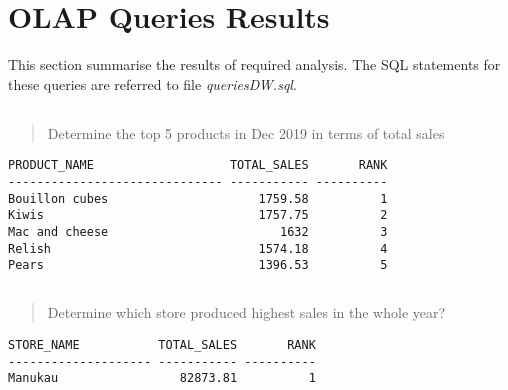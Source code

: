 \documentclass[
  a4paper,
]{article}
\newcommand{\sqloutputbegin}{
        \hspace{0.5cm}
        \begin{minipage}[c]{0.93\linewidth} 
        \centering
        \begin{tcolorbox}[colback=gray!8, colframe=white,
            boxrule=0pt, coltitle=black,
            colbacktitle=gray!15, title={SQL Output}]
        \centering
        \small}
\newcommand{\sqloutputend}{
        \end{tcolorbox} 
        \end{minipage}}
\begin{document}
\hypertarget{olap-queries-results}{%
\section{OLAP Queries Results}\label{olap-queries-results}}

This section summarise the results of required analysis. The SQL
statements for these queries are referred to file \emph{queriesDW.sql}.

\let\oldsubsection\thesubsection
\renewcommand*{\thesubsection}{Question~\arabic{subsection}}

\hypertarget{section}{%
\subsection{}\label{section}}

\begin{quote}
Determine the top 5 products in Dec 2019 in terms of total sales
\end{quote}

\sqloutputbegin

\begin{verbatim}
PRODUCT_NAME                   TOTAL_SALES       RANK
------------------------------ ----------- ----------
Bouillon cubes                     1759.58          1
Kiwis                              1757.75          2
Mac and cheese                        1632          3
Relish                             1574.18          4
Pears                              1396.53          5
\end{verbatim}

\sqloutputend

\hypertarget{section-1}{%
\subsection{}\label{section-1}}

\begin{quote}
Determine which store produced highest sales in the whole year?
\end{quote}

\sqloutputbegin

\begin{verbatim}
STORE_NAME           TOTAL_SALES       RANK
-------------------- ----------- ----------
Manukau                 82873.81          1
\end{verbatim}

\sqloutputend

\hypertarget{section-2}{%
\subsection{}\label{section-2}}
\end{document}
